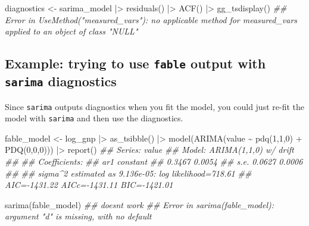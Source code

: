 \documentclass[
  letterpaper,
  DIV=11,
  numbers=noendperiod]{scrartcl}
\newenvironment{Shaded}{\begin{snugshade}}{\end{snugshade}}
\newcommand{\DecValTok}[1]{\textcolor[rgb]{0.68,0.00,0.00}{#1}}
\newcommand{\DocumentationTok}[1]{\textcolor[rgb]{0.37,0.37,0.37}{\textit{#1}}}
\newcommand{\FunctionTok}[1]{\textcolor[rgb]{0.28,0.35,0.67}{#1}}
\newcommand{\NormalTok}[1]{\textcolor[rgb]{0.00,0.23,0.31}{#1}}
\newcommand{\OtherTok}[1]{\textcolor[rgb]{0.00,0.23,0.31}{#1}}
\newcommand{\SpecialCharTok}[1]{\textcolor[rgb]{0.37,0.37,0.37}{#1}}
\begin{document}
\begin{Shaded}
\begin{Highlighting}[]
\NormalTok{diagnostics }\OtherTok{\textless{}{-}}\NormalTok{ sarima\_model }\SpecialCharTok{|\textgreater{}}
  \FunctionTok{residuals}\NormalTok{() }\SpecialCharTok{|\textgreater{}}
  \FunctionTok{ACF}\NormalTok{() }\SpecialCharTok{|\textgreater{}}
  \FunctionTok{gg\_tsdisplay}\NormalTok{()}
\DocumentationTok{\#\# Error in UseMethod("measured\_vars"): no applicable method for \textquotesingle{}measured\_vars\textquotesingle{} applied to an object of class "NULL"}
\end{Highlighting}
\end{Shaded}

\subsection{\texorpdfstring{Example: trying to use \texttt{fable} output
with \texttt{sarima}
diagnostics}{Example: trying to use fable output with sarima diagnostics}}\label{example-trying-to-use-fable-output-with-sarima-diagnostics}

Since \texttt{sarima} outputs diagnostics when you fit the model, you
could just re-fit the model with \texttt{sarima} and then use the
diagnostics.

\begin{Shaded}
\begin{Highlighting}[]
\NormalTok{fable\_model }\OtherTok{\textless{}{-}}\NormalTok{ log\_gnp }\SpecialCharTok{|\textgreater{}} 
  \FunctionTok{as\_tsibble}\NormalTok{() }\SpecialCharTok{|\textgreater{}}
  \FunctionTok{model}\NormalTok{(}\FunctionTok{ARIMA}\NormalTok{(value }\SpecialCharTok{\textasciitilde{}} \FunctionTok{pdq}\NormalTok{(}\DecValTok{1}\NormalTok{,}\DecValTok{1}\NormalTok{,}\DecValTok{0}\NormalTok{) }\SpecialCharTok{+} \FunctionTok{PDQ}\NormalTok{(}\DecValTok{0}\NormalTok{,}\DecValTok{0}\NormalTok{,}\DecValTok{0}\NormalTok{))) }\SpecialCharTok{|\textgreater{}} \FunctionTok{report}\NormalTok{()}
\DocumentationTok{\#\# Series: value }
\DocumentationTok{\#\# Model: ARIMA(1,1,0) w/ drift }
\DocumentationTok{\#\# }
\DocumentationTok{\#\# Coefficients:}
\DocumentationTok{\#\#          ar1  constant}
\DocumentationTok{\#\#       0.3467    0.0054}
\DocumentationTok{\#\# s.e.  0.0627    0.0006}
\DocumentationTok{\#\# }
\DocumentationTok{\#\# sigma\^{}2 estimated as 9.136e{-}05:  log likelihood=718.61}
\DocumentationTok{\#\# AIC={-}1431.22   AICc={-}1431.11   BIC={-}1421.01}

\FunctionTok{sarima}\NormalTok{(fable\_model) }\DocumentationTok{\#\# doesn\textquotesingle{}t work}
\DocumentationTok{\#\# Error in sarima(fable\_model): argument "d" is missing, with no default}
\end{Highlighting}
\end{Shaded}
\end{document}
